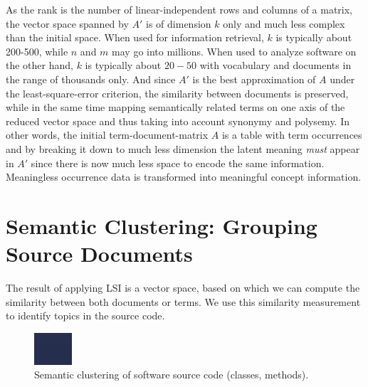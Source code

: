 \documentclass[10pt]{book}
\begin{document}
As the rank is the number of linear-independent rows and columns of a matrix, the vector space spanned by $A'$ is of dimension $k$ only and much less complex than the initial space. When used for information retrieval, $k$ is typically about 200-500, while $n$ and $m$ may go into millions. When used to analyze software on the other hand, $k$ is typically about $20-50$ with vocabulary and documents in the range of thousands only. And since $A'$ is the best approximation of $A$ under the least-square-error criterion, the similarity between documents is preserved, while in the same time mapping semantically related terms on one axis of the reduced vector space and thus taking into account synonymy and polysemy. In other words, the initial term-document-matrix $A$ is a table with term occurrences and by breaking it down to much less dimension the latent meaning \emph{must} appear in $A'$ since there is now much less space to encode the same information. Meaningless occurrence data is transformed into meaningful concept information.

\section{Semantic Clustering: Grouping Source Documents}\label{sec:sekla}

The result of applying LSI is a vector space, based on which we can compute the similarity between both documents or terms. We use this similarity measurement to identify topics in the source code.

\begin{figure}[htb]
\begin{center}
\includegraphics[width=.8\columnwidth]{clustering}
\caption{Semantic clustering of software source code (\eg classes, methods).}
\label{fig:clustering}
\end{center}
\end{figure}
\end{document}
